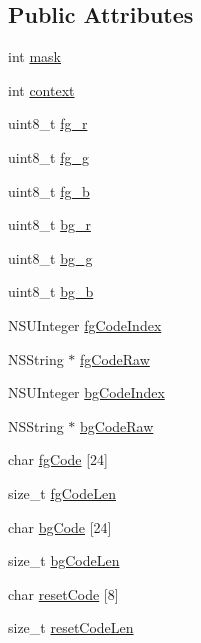 \subsection*{Public Attributes}
\begin{DoxyCompactItemize}
\item 
int \hyperlink{interface_d_d_t_t_y_logger_color_profile_ab070867743d6c78f573291b6e534d2ec}{mask}
\item 
int \hyperlink{interface_d_d_t_t_y_logger_color_profile_aaa819da08b5ca212c7dd0de96d28609f}{context}
\item 
uint8\-\_\-t \hyperlink{interface_d_d_t_t_y_logger_color_profile_a874b9a80069df7f3c18edcd60e307399}{fg\-\_\-r}
\item 
uint8\-\_\-t \hyperlink{interface_d_d_t_t_y_logger_color_profile_ae916fa6afbbda49c9605aaa07e38548a}{fg\-\_\-g}
\item 
uint8\-\_\-t \hyperlink{interface_d_d_t_t_y_logger_color_profile_af6b6dd3622cd2a75fe5332c6967e9f55}{fg\-\_\-b}
\item 
uint8\-\_\-t \hyperlink{interface_d_d_t_t_y_logger_color_profile_a51572a5576d7e0fd9647f5a1c8d6998a}{bg\-\_\-r}
\item 
uint8\-\_\-t \hyperlink{interface_d_d_t_t_y_logger_color_profile_aa5b5300a9472b9a9dcc601683e0acc0a}{bg\-\_\-g}
\item 
uint8\-\_\-t \hyperlink{interface_d_d_t_t_y_logger_color_profile_a1eaf5d77db16d7824be560f2323a7e5f}{bg\-\_\-b}
\item 
N\-S\-U\-Integer \hyperlink{interface_d_d_t_t_y_logger_color_profile_a6f45aaf39a63746e7864492ccd3a263e}{fg\-Code\-Index}
\item 
N\-S\-String $\ast$ \hyperlink{interface_d_d_t_t_y_logger_color_profile_ae35805abd96b32d4b54e84d6b3b41afe}{fg\-Code\-Raw}
\item 
N\-S\-U\-Integer \hyperlink{interface_d_d_t_t_y_logger_color_profile_abb80aebfcf2104bd90ae4ddfd5bd1fd8}{bg\-Code\-Index}
\item 
N\-S\-String $\ast$ \hyperlink{interface_d_d_t_t_y_logger_color_profile_aa6821a010917cba7904a1e0ae597d9ec}{bg\-Code\-Raw}
\item 
char \hyperlink{interface_d_d_t_t_y_logger_color_profile_a931e7ff4fbfec9a8b4f089e47d471ffe}{fg\-Code} \mbox{[}24\mbox{]}
\item 
size\-\_\-t \hyperlink{interface_d_d_t_t_y_logger_color_profile_ae04904daec9b05ef6fdb36079e6b857d}{fg\-Code\-Len}
\item 
char \hyperlink{interface_d_d_t_t_y_logger_color_profile_ad1f1c9a3477047de0b4fb9863797eb60}{bg\-Code} \mbox{[}24\mbox{]}
\item 
size\-\_\-t \hyperlink{interface_d_d_t_t_y_logger_color_profile_a294532369ca8c8f4ce20af93d4fc4374}{bg\-Code\-Len}
\item 
char \hyperlink{interface_d_d_t_t_y_logger_color_profile_a4172364f17704b22974645c9ec8cb38c}{reset\-Code} \mbox{[}8\mbox{]}
\item 
size\-\_\-t \hyperlink{interface_d_d_t_t_y_logger_color_profile_a520426bd0ebbbdce03638fc486b5b462}{reset\-Code\-Len}
\end{DoxyCompactItemize}


